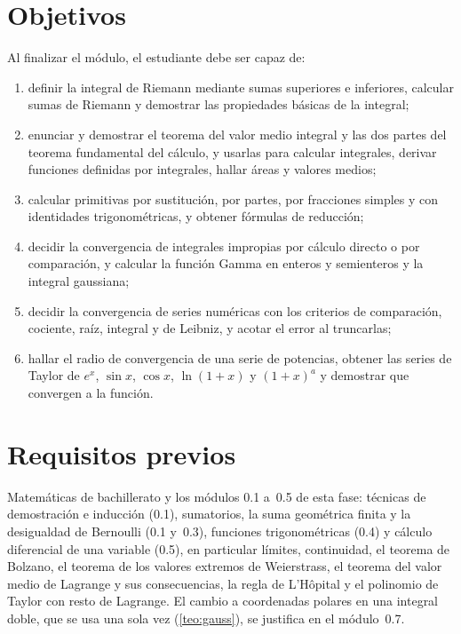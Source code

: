 \documentclass[11pt,a4paper,twoside,openany]{book}
\begin{document}
\section*{Objetivos}
Al finalizar el módulo, el estudiante debe ser capaz de:
\begin{enumerate}[label=\arabic*.]
  \item definir la integral de Riemann mediante sumas superiores e inferiores, calcular sumas de Riemann y demostrar las propiedades básicas de la integral;
  \item enunciar y demostrar el teorema del valor medio integral y las dos partes del teorema fundamental del cálculo, y usarlas para calcular integrales, derivar funciones definidas por integrales, hallar áreas y valores medios;
  \item calcular primitivas por sustitución, por partes, por fracciones simples y con identidades trigonométricas, y obtener fórmulas de reducción;
  \item decidir la convergencia de integrales impropias por cálculo directo o por comparación, y calcular la función Gamma en enteros y semienteros y la integral gaussiana;
  \item decidir la convergencia de series numéricas con los criterios de comparación, cociente, raíz, integral y de Leibniz, y acotar el error al truncarlas;
  \item hallar el radio de convergencia de una serie de potencias, obtener las series de Taylor de $e^{x}$, $\sin x$, $\cos x$, $\ln(1+x)$ y $(1+x)^{a}$ y demostrar que convergen a la función.
\end{enumerate}

\section*{Requisitos previos}
Matemáticas de bachillerato y los módulos 0.1 a~0.5 de esta fase: técnicas de demostración e inducción (0.1), sumatorios, la suma geométrica finita y la desigualdad de Bernoulli (0.1 y~0.3), funciones trigonométricas (0.4) y cálculo diferencial de una variable (0.5), en particular límites, continuidad, el teorema de Bolzano, el teorema de los valores extremos de Weierstrass, el teorema del valor medio de Lagrange y sus consecuencias, la regla de L'Hôpital y el polinomio de Taylor con resto de Lagrange. El cambio a coordenadas polares en una integral doble, que se usa una sola vez (\cref{teo:gauss}), se justifica en el módulo~0.7.
\end{document}
